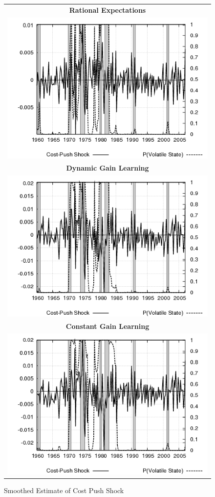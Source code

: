\documentclass[12pt]{article}
\begin{document}
\begin{figure}[ht]
\caption{Smoothed Estimate of Cost Push Shock}\label{fg:costpush}
\begin{center}
\begin{tabular}{c}
\textbf{Rational Expectations} \\  
\includegraphics[scale=0.5]{results_re/costpush.png} \\
\textbf{Dynamic Gain Learning} \\
\includegraphics[scale=0.5]{results_dg8_wlsinit/costpush.png} \\
\textbf{Constant Gain Learning} \\
\includegraphics[scale=0.5]{results_cg_wlsinit/costpush.png} 

\end{tabular}
\end{center}
\end{figure}
\end{document}

